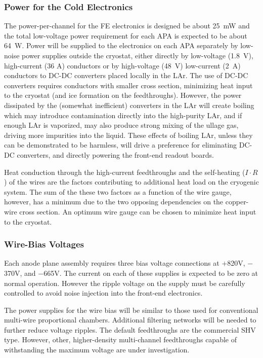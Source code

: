 %
\subsubsection{Power for the Cold Electronics }
\label{subsubsec:ce_feedthrough_power}

The power-per-channel for the FE electronics is designed be about 25~mW and the total low-voltage
power requirement for each APA is expected to be about 64~W.
Power will be supplied to the electronics on each APA separately by low-noise
power supplies outside the cryostat, either directly by
low-voltage (1.8~V), high-current (36 A) conductors or by high-voltage (48~V)
low-current (2~A) conductors to DC-DC converters placed locally in the LAr.
The use of DC-DC converters requires conductors with smaller cross section,
minimizing heat input to the cryostat (and ice formation on the feedthroughs).
However, the power dissipated by the (somewhat inefficient) converters in
the LAr will create boiling which may introduce contamination directly into the 
high-purity LAr, and if enough LAr is vaporized, may also produce strong mixing of the
ullage gas, driving more impurities into the liquid.
These effects of boiling LAr, unless they can be demonstrated to be harmless,
will drive a preference for eliminating DC-DC converters, and directly powering the front-end readout boards.

Heat conduction through the high-current feedthroughs and the self-heating ($I\cdot R$) of the wires are the factors
contributing to additional heat load on the cryogenic system.
The sum of the these two factors as a function of the wire gauge, however, has a minimum 
due to the two opposing dependencies on the copper-wire cross section.
An optimum wire gauge can be chosen to minimize heat input to the cryostat.
%
\subsubsection{Wire-Bias Voltages}
\label{subsubsec:ce_feedthrough_wirebias}

Each anode plane assembly requires three bias voltage connections 
at $+$820V, $-$370V, and $-$665V.
The current on each of these supplies is expected to be zero at normal operation.
However the ripple voltage on the supply must be carefully controlled 
to avoid noise injection into the front-end electronics.  

The power supplies for the wire bias will be similar to 
those used for conventional multi-wire proportional chambers. 
Additional filtering networks will 
be needed to further reduce voltage ripples.  
The default feedthroughs are the commercial SHV type.  
However,  other, higher-density multi-channel 
feedthroughs capable of withstanding the maximum voltage are under investigation.  

